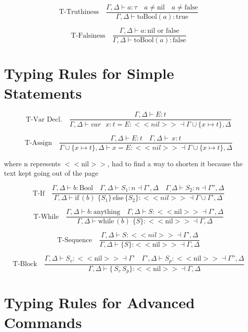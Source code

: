 \documentclass{article}
\begin{document}
{\[
\text{T-Truthiness} \quad \frac{\Gamma, \Delta \vdash a : \tau \quad a \neq \text{nil} \quad a \neq \text{false}}{\Gamma, \Delta \vdash \text{toBool}(a) : \text{true}}
\]

\[
\text{T-Falsiness} \quad \frac{\Gamma, \Delta \vdash a : \text{nil or false}}{\Gamma, \Delta \vdash \text{toBool}(a) : \text{false}}
\]

\section*{Typing Rules for Simple Statements}

\[
\text{T-Var Decl.} \quad \frac{\Gamma, \Delta \vdash E : t }{\Gamma, \Delta \vdash var \text{ } x: t = E : <<nil>> \dashv \Gamma \cup \{ x \mapsto t \}, \Delta} 
\]

\[
\text{T-Assign} \quad \frac{\Gamma, \Delta \vdash E : t \quad \Gamma, \Delta \vdash \, x : t}{\Gamma \cup \{ x \mapsto t \}, \Delta \vdash x = E : <<nil>>\dashv \Gamma \cup \{ x \mapsto t \}, \Delta} 
\]

{\large where n represents $<<$nil$>>$, had to find a way to shorten it because the text kept going out of the page \par}

\[
\text{T-If} \quad \frac{\Gamma, \Delta \vdash b : \text{Bool} \quad \Gamma, \Delta \vdash S_1 : n \dashv \Gamma \text{'}, \Delta \quad \Gamma_, \Delta \vdash S_2 : n \dashv \Gamma \text{''}, \Delta}{\Gamma, \Delta \vdash \text{if} \, (b) \, \, \{S_1\} \, \text{else} \, \{S_2\} : <<nil>> \dashv \Gamma \cup \Gamma \text{'}, \Delta} 
\]

\[
\text{T-While} \quad \frac{\Gamma, \Delta \vdash b : \text{anything} \quad \Gamma, \Delta \vdash S : \text{$<<$nil$>>$} \dashv \Gamma \text{'}, \Delta}{\Gamma, \Delta \vdash \text{while} \, (b) \, \, \{S\} : \text{$<<$nil$>>$} \dashv \Gamma, \Delta}
\]

\[
\text{T-Sequence} \quad \frac{\Gamma, \Delta \vdash S : <<nil>> \dashv \Gamma \text{'}, \Delta}{\Gamma, \Delta \vdash \text{{\{}} S \text{\}:} \text{$<<$nil$>>$} \dashv \Gamma, \Delta}
\]


\[
\text{T-Block} \quad \frac{\Gamma, \Delta \vdash S_v : \text{$<<$nil$>>$} \dashv \Gamma \text{'} \quad \Gamma \text{'}, \Delta \vdash S_p : \text{$<<$nil$>>$} \dashv \Gamma \text{''}, \Delta }{\Gamma, \Delta \vdash \text{{\{}} \, S_v \, S_p \text{\}:} \text{$<<$nil$>>$} \dashv \Gamma, \Delta}
\]

\section*{Typing Rules for Advanced Commands}

}
\end{document}
